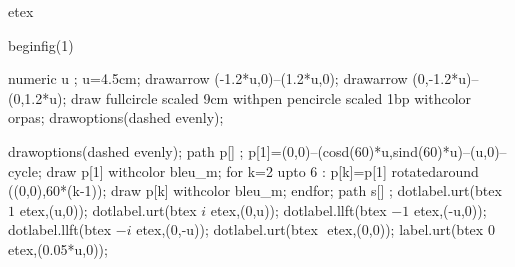 \documentclass[12pt]{article}
\begin{document}
 
etex 



%
%
%
%
%
%
%
%
 beginfig(1)



 numeric u ;
 u=4.5cm;
 drawarrow (-1.2*u,0)--(1.2*u,0);
 drawarrow (0,-1.2*u)--(0,1.2*u);
 draw fullcircle scaled 9cm withpen pencircle scaled 1bp withcolor orpas;
 drawoptions(dashed evenly);


  drawoptions(dashed evenly);
  path p[] ;
  p[1]=(0,0)--(cosd(60)*u,sind(60)*u)--(u,0)--cycle;
  draw p[1] withcolor  bleu_m;
  for k=2 upto 6 : p[k]=p[1] rotatedaround ((0,0),60*(k-1));
    draw p[k] withcolor bleu_m;
  endfor;
  path s[] ;
dotlabel.urt(btex $1$ etex,(u,0));
dotlabel.urt(btex $i$ etex,(0,u));
dotlabel.llft(btex $-1$ etex,(-u,0));
dotlabel.llft(btex $-i$ etex,(0,-u));
dotlabel.urt(btex $ $ etex,(0,0));
label.urt(btex $0$ etex,(0.05*u,0));
\end{document}
